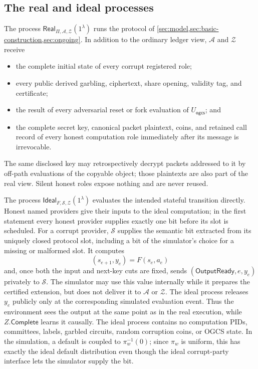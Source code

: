 \subsection{The real and ideal processes}

The process
$\mathsf{Real}_{\Pi,\mathcal A,\mathcal Z}(1^\lambda)$ runs the protocol of
\cref{sec:model,sec:basic-construction,sec:ongoing}.  In addition to the
ordinary ledger view, $\mathcal A$ and $\mathcal Z$ receive
\begin{itemize}
  \item the complete initial state of every corrupt registered role;
  \item every public derived garbling, ciphertext, share opening, validity
    tag, and certificate;
  \item the result of every adversarial reset or fork evaluation of
    $U_{\mathsf{ogcs}}$; and
  \item the complete secret key, canonical packet plaintext, coins, and
    retained call record of every honest computation role immediately after
    its message is irrevocable.
\end{itemize}
The same disclosed key may retrospectively decrypt packets addressed to it by
off-path evaluations of the copyable object; those plaintexts are also part
of the real view.  Silent honest roles expose nothing and are never reused.

The process
$\mathsf{Ideal}_{F,\mathcal S,\mathcal Z}(1^\lambda)$ evaluates the intended
stateful transition directly.  Honest named providers give their inputs to
the ideal computation; in the first statement every honest provider supplies
exactly one bit before its slot is scheduled.  For a corrupt provider,
$\mathcal S$ supplies the semantic bit extracted from its uniquely closed
protocol slot, including a bit of the simulator's choice for a missing or
malformed slot.  It computes
\[
  (s_{e+1},y_e)=F(s_e,a_e)
\]
and, once both the input and next-key cuts are fixed, sends
$(\mathsf{OutputReady},e,y_e)$ privately to $\mathcal S$.  The simulator may
use this value internally while it prepares the certified extension, but does
not deliver it to $\mathcal A$ or $\mathcal Z$.  The ideal process releases
$y_e$ publicly only at the corresponding simulated evaluation event.  Thus
the environment sees the output at the same point as in the real execution,
while $Z.\mathsf{Complete}$ learns it causally.  The ideal process contains no
computation PIDs, committees, labels, garbled circuits, random corruption
coins, or OGCS state.  In the simulation, a default is coupled to
$\pi_w^{-1}(0)$; since $\pi_w$ is uniform, this has exactly the ideal default
distribution even though the ideal corrupt-party interface lets the simulator
supply the bit.

